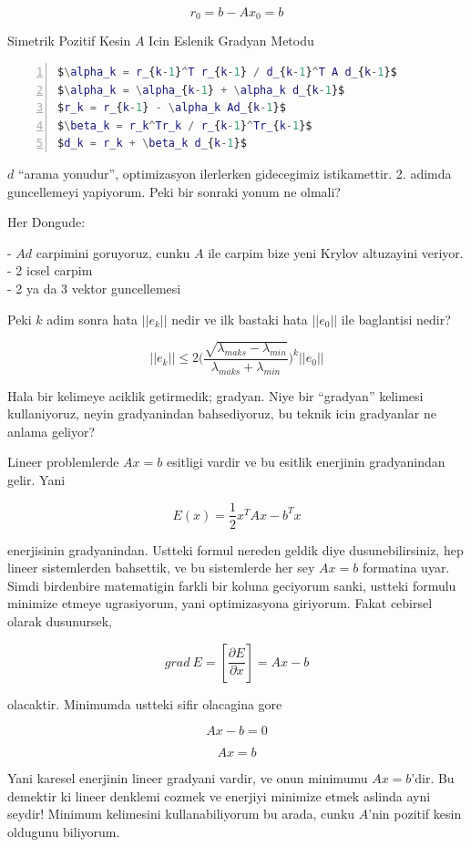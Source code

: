 \documentclass[12pt,fleqn]{article}\usepackage{../common}
\begin{document}
\[ r_0 = b - Ax_0  = b\]

Simetrik Pozitif Kesin $A$ Icin Eslenik Gradyan Metodu

\begin{lstlisting}[language=Matlab,mathescape,numbers=left,xleftmargin=3.0ex]
$\alpha_k = r_{k-1}^T r_{k-1} / d_{k-1}^T A d_{k-1}$
$\alpha_k = \alpha_{k-1} + \alpha_k d_{k-1}$
$r_k = r_{k-1} - \alpha_k Ad_{k-1}$
$\beta_k = r_k^Tr_k / r_{k-1}^Tr_{k-1}$
$d_k = r_k + \beta_k d_{k-1}$
\end{lstlisting}

$d$ ``arama yonudur'', optimizasyon ilerlerken gidecegimiz
istikamettir. 2. adimda guncellemeyi yapiyorum. Peki bir sonraki yonum ne
olmali? 

Her Dongude:

- $Ad$ carpimini goruyoruz, cunku $A$ ile carpim bize yeni Krylov altuzayini
veriyor.\\
- 2 icsel carpim \\
- 2 ya da 3 vektor guncellemesi

Peki $k$ adim sonra hata $||e_k||$ nedir ve ilk bastaki hata $||e_0||$ ile
baglantisi nedir? 

\[ ||e_k|| \le 2  \bigg(
\frac{ \sqrt{ \lambda_{maks} - \lambda_{min}}}
{\lambda_{maks} + \lambda_{min}}
\bigg)^k||e_0||
\]

Hala bir kelimeye aciklik getirmedik; gradyan. Niye bir ``gradyan''
kelimesi kullaniyoruz, neyin gradyanindan bahsediyoruz, bu teknik icin
gradyanlar ne anlama geliyor?

Lineer problemlerde $Ax = b$ esitligi vardir ve bu esitlik enerjinin
gradyanindan gelir. Yani 

\[ E(x) = \frac{ 1}{2}x^TAx - b^Tx \]

enerjisinin gradyanindan. Ustteki formul nereden geldik diye
dusunebilirsiniz, hep lineer sistemlerden bahsettik, ve bu sistemlerde her
sey $Ax = b$ formatina uyar. Simdi birdenbire matematigin farkli bir koluna
geciyorum sanki, ustteki formulu minimize etmeye ugrasiyorum, yani
optimizasyona giriyorum. Fakat cebirsel olarak dusunursek, 

\[ grad \ E = [\frac{\partial E}{\partial x} ]  = Ax - b \]

olacaktir. Minimumda ustteki sifir olacagina gore 

\[ Ax - b = 0 \]

\[ Ax = b \]

Yani karesel enerjinin lineer gradyani vardir, ve onun minimumu $Ax =
b$'dir. 
Bu demektir ki lineer denklemi cozmek ve enerjiyi minimize etmek
aslinda ayni seydir! Minimum kelimesini kullanabiliyorum bu arada, cunku
$A$'nin pozitif kesin oldugunu biliyorum. 
\end{document}
